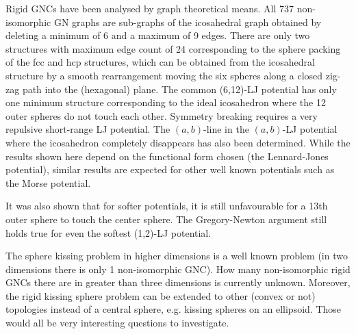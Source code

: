 Rigid \acp{GNC} have been analysed by graph theoretical means. All 737
non-isomorphic \ac{GN} graphs are sub-graphs of the icosahedral graph obtained by
deleting a minimum of 6 and a maximum of 9 edges. There are only two structures
with maximum edge count of 24 corresponding to the sphere packing of the
\ac{fcc} and \ac{hcp} structures, which can be obtained from the icosahedral
structure by a smooth rearrangement moving the six spheres along a closed
zig-zag path into the (hexagonal) plane. The common (6,12)-\ac{LJ} potential has
only one minimum structure corresponding to the ideal icosahedron where the 12
outer spheres do not touch each other. Symmetry breaking requires a very
repulsive short-range LJ potential. The $(a,b)$-line in the $(a,b)$-\ac{LJ}
potential where the icosahedron completely disappears has also been determined.
While the results shown here depend on the functional form chosen (the
Lennard-Jones potential), similar results are expected for other well known
potentials such as the Morse potential.

It was also shown that for softer potentials, it is still unfavourable for a
13th outer sphere to touch the center sphere. The Gregory-Newton argument still
holds true for even the softest (1,2)-\ac{LJ} potential.

The sphere kissing problem in higher dimensions is a well known
problem\autocite{Conway_SpherePackingsLattices_1999} (in two dimensions there is
only 1 non-isomorphic \ac{GNC}). How many non-isomorphic rigid \acp{GNC} there
are in greater than three dimensions is currently unknown. Moreover, the rigid
kissing sphere problem can be extended to other (convex or not) topologies
instead of a central sphere, e.g. kissing spheres on an ellipsoid. Those would
all be very interesting questions to investigate.
